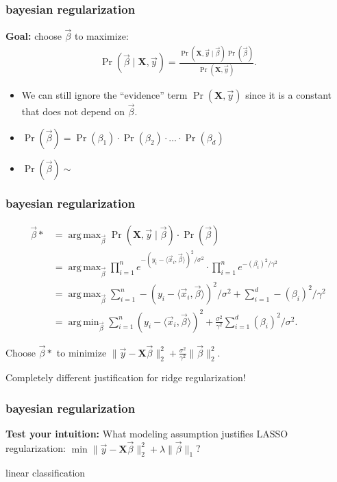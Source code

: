\documentclass[handout,compress]{beamer}
\newcommand{\bv}[1]{\mathbf{#1}}
\DeclareMathOperator*{\argmin}{arg\,min}
\DeclareMathOperator*{\argmax}{arg\,max}
\begin{document}
\begin{frame}
	\frametitle{bayesian regularization}
	\textbf{Goal:}  choose $\vec{\beta}$ to maximize:
	\begin{align*}
		\Pr(\vec{\beta} \mid \bv{X},\vec{y} )  = \frac{\Pr(\bv{X},\vec{y} \mid  \vec{\beta} ) \Pr(\vec{\beta} )  }{\Pr(\bv{X},\vec{y} )} .
	\end{align*}
	\begin{itemize}
	\item We can still ignore the ``evidence'' term $\Pr(\bv{X},\vec{y})$ since it is a constant that does not depend on $\vec{\beta}$.
	\item $\Pr(\vec{\beta}) = \Pr({\beta}_1)\cdot  \Pr({\beta}_2)\cdot \ldots \cdot \Pr({\beta}_d)$
	\item $\Pr(\vec{\beta})  \sim $
	\end{itemize}
\end{frame}

\begin{frame}
	\frametitle{bayesian regularization}
	\begin{align*}
	\vec{\beta}* &=\argmax_{\vec{\beta}}\Pr(\bv{X},\vec{y} \mid  \vec{\beta} ) \cdot \Pr(\vec{\beta} ) \\
	& = \argmax_{\vec{\beta}} \prod_{i=1}^n e^{-(y_i - \langle \vec{x}_i, \vec{\beta} \rangle)^2/\sigma^2} \cdot \prod_{i=1}^n e^{-(\beta_i)^2/\gamma^2} \\ 
	&= \argmax_{\vec{\beta}}  \sum_{i=1}^n -(y_i - \langle \vec{x}_i, \vec{\beta} \rangle)^2/\sigma^2 + \sum_{i=1}^d -(\beta_i)^2/\gamma^2\\
	&= \argmin_{\vec{\beta}}  \sum_{i=1}^n (y_i - \langle \vec{x}_i, \vec{\beta} \rangle)^2+ \frac{\sigma^2 }{\gamma^2}\sum_{i=1}^d (\beta_i)^2/\sigma^2.
	\end{align*}
	
	Choose $\vec{\beta}*$ to minimize $\|\vec{y} - \bv{X}\vec{\beta}\|_2^2 + \frac{\sigma^2 }{\gamma^2}\|\vec{\beta}\|_2^2$.
	
	
	\alert{Completely different justification for ridge regularization!}
\end{frame}

\begin{frame}
	\frametitle{bayesian regularization}
	\textbf{Test your intuition:} What modeling assumption justifies LASSO regularization: $\min \|\vec{y} - \bv{X}\vec{\beta}\|_2^2 + \lambda\|\vec{\beta}\|_1$?
\end{frame}

\begin{frame}[standout]
	linear classification
\end{frame}
\end{document}

